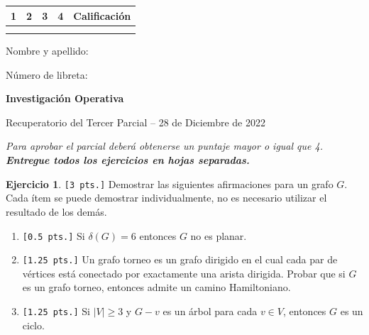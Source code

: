 \documentclass[a4paper,oneside,12pt]{amsart}
\newcommand{\nombremateria}
{Investigaci\'on Operativa}
\newcommand{\numeroparcial}
    { Recuperatorio del Tercer Parcial }
\newcommand{\fecha}
    {28 de Diciembre de 2022}
\theoremstyle{definition}
\newtheorem{quest}{Ejercicio}
\begin{document}
\hfill \hfill
\begin{tabular}[c]{|c|c|c|c|c|}
\hline 
1 & 2 & 3 & 4 & Calificaci\'on \\ \hline \hline
\hspace{1.2 cm} & \hspace{1.2 cm} & \hspace{1.2 cm} & \hspace{1.2 cm}  &\hspace{1.5 cm} \\
\hspace{1.2 cm} & \hspace{1.2 cm} & \hspace{1.2 cm} & \hspace{1.2 cm}  &\hspace{1.5 cm} \\ \hline

\end{tabular}

\vspace{-1cm}

\noindent Nombre y apellido:

\vspace{0.2cm}

\noindent Número de libreta:

\noindent \hrulefill 

\smallskip
\renewcommand{\baselinestretch}{1.1}

\begin{center}
	\large \textbf{\nombremateria} 
	
	\numeroparcial -- \fecha
\end{center}

\noindent\textit{Para aprobar el parcial deberá obtenerse un puntaje mayor o igual que 4. \textbf{Entregue todos los ejercicios en hojas separadas.}}

\vspace{.6cm}
\renewcommand{\theenumi}{\textbf{\arabic{enumi}}}


\begin{quest}\verb|[3 pts.]|  
Demostrar las siguientes afirmaciones para un grafo $G$. Cada ítem se puede demostrar individualmente, no es necesario utilizar el resultado de los demás.
\begin{enumerate}[label=\alph*)]
    \item \verb|[0.5 pts.]| Si $\delta(G)=6$ entonces $G$ no es planar.
    \item \verb|[1.25 pts.]| Un grafo torneo es un grafo dirigido en el cual cada par de vértices está conectado por exactamente una arista dirigida. Probar que si $G$ es un grafo torneo, entonces admite un camino Hamiltoniano.
    \item  \verb|[1.25 pts.]| Si $|V|\geq 3$ y $G-v$ es un árbol para cada $v\in V$, entonces $G$ es un ciclo.
\end{enumerate}

\end{quest}
\end{document}
